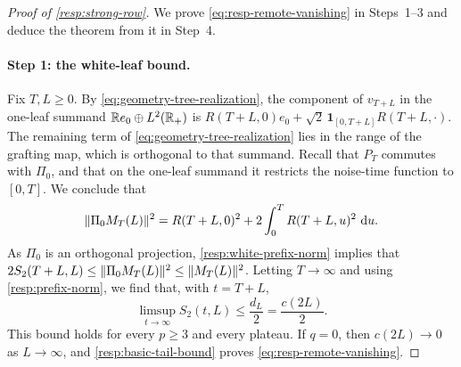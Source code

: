 \begin{proof}[Proof of \cref{resp:strong-row}]
We prove \eqref{eq:resp-remote-vanishing} in Steps~1--3 and deduce the theorem from it in Step~4.

\paragraph{Step 1: the white-leaf bound.}
Fix $T,L\ge0$. By \eqref{eq:geometry-tree-realization}, the component of $v_{T+L}$ in the one-leaf summand $\mathbb Re_0\oplus L^2(\mathbb R_+)$ is $R(T+L,0)e_0+\sqrt2\,\mathbf1_{[0,T+L]}R(T+L,\cdot)$. The remaining term of \eqref{eq:geometry-tree-realization} lies in the range of the grafting map, which is orthogonal to that summand. Recall that $P_T$ commutes with $\Pi_0$, and that on the one-leaf summand it restricts the noise-time function to $[0,T]$. We conclude that
\begin{equation}
 \lVert\Pi_0M_T(L)\rVert^2=R(T+L,0)^2+2\int_0^TR(T+L,u)^2\,\mathop{}\!\mathrm d u.
 \label{resp:white-prefix-norm}
\end{equation}
As $\Pi_0$ is an orthogonal projection, \eqref{resp:white-prefix-norm} implies that $2S_2(T+L,L)\le\lVert\Pi_0M_T(L)\rVert^2\le\lVert M_T(L)\rVert^2$. Letting $T\to\infty$ and using \eqref{resp:prefix-norm}, we find that, with $t=T+L$,
\begin{equation}
 \limsup_{t\to\infty}S_2(t,L)\le\frac{d_L}2=\frac{c(2L)}2.
 \label{resp:basic-tail-bound}
\end{equation}
This bound holds for every $p\ge3$ and every plateau. If $q=0$, then $c(2L)\to0$ as $L\to\infty$, and \eqref{resp:basic-tail-bound} proves \eqref{eq:resp-remote-vanishing}.


\end{proof}

